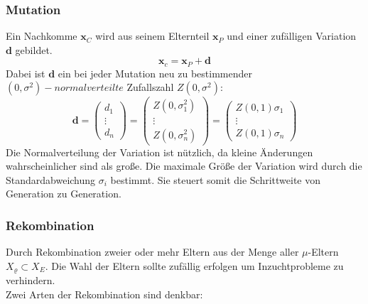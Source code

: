 \subsubsection[Mutation]{Mutation}
Ein Nachkomme $\mathbf{x}_C$ wird aus seinem Elternteil $\mathbf{x}_P$ und einer zufälligen Variation $\mathbf{d}$ gebildet.
\begin{equation} \label{eq:Mutation_Child}
	\mathbf{x}_c = \mathbf{x}_P + \mathbf{d}
\end{equation}
Dabei ist $\mathbf{d}$ ein bei jeder Mutation neu zu bestimmender $(0,\sigma^2)-normalverteilte$ Zufallszahl $Z(0,\sigma^2)$:
\begin{equation}\label{eq:wavenumber_trilateration_model2}
\mathbf{d}=
\left(
	\begin{array}{c}
		d_1 \\
		\vdots\\
		d_n 
	\end{array}
\right)
=
\left(
	\begin{array}{c}
		Z(0,\sigma_1^2) \\
		\vdots\\
		Z(0,\sigma_n^2) 
	\end{array}
\right)
=
\left(
	\begin{array}{c}
		Z(0,1) \sigma_1 \\
		\vdots\\
		Z(0,1) \sigma_n 
	\end{array}
\right)
\end{equation}
%
Die Normalverteilung der Variation ist nützlich, da kleine Änderungen wahrscheinlicher sind als große. Die maximale Größe der Variation wird durch die Standardabweichung $\sigma_i$ bestimmt. Sie steuert somit die Schrittweite von Generation zu Generation.
%
\subsubsection[Rekombination]{Rekombination}
Durch Rekombination zweier oder mehr Eltern aus der Menge aller $\mu$-Eltern $X_{\varrho} \subset X_E$. Die Wahl der Eltern sollte zufällig erfolgen um Inzuchtprobleme zu verhindern.\\
Zwei Arten der Rekombination sind denkbar:\\

